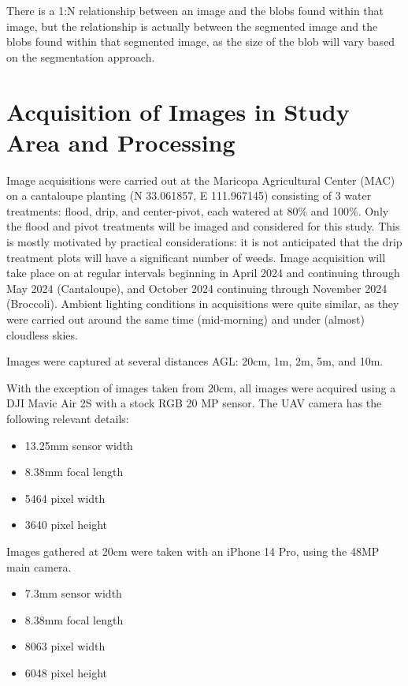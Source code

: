 \documentclass[letterpaper]{article}
\begin{document}
{There is a 1:N relationship between an image and the blobs found within that image, but the relationship is actually between the segmented image and the blobs found within that segmented image, as the size of the blob will vary based on the segmentation approach.

% 
%
\section{Acquisition of Images in Study Area and Processing}
Image acquisitions were carried out at the Maricopa Agricultural Center (MAC) on a cantaloupe planting (N 33.061857, E 111.967145) consisting of 3 water treatments: flood, drip, and center-pivot, each watered at 80\% and 100\%. Only the flood and pivot treatments will be imaged and considered for this study. This is mostly motivated by practical considerations: it is not anticipated that the drip treatment plots will have a significant number of weeds.  Image acquisition will take place on at regular intervals beginning in April 2024 and continuing through May 2024 (Cantaloupe), and October 2024 continuing through November 2024 (Broccoli).  Ambient lighting conditions in acquisitions were quite similar, as they were carried out around the same time (mid-morning) and under (almost) cloudless skies.

Images were captured at several distances AGL: 20cm, 1m, 2m, 5m, and 10m.

With the exception of images taken from 20cm, all images were acquired using a DJI Mavic Air 2S with a stock RGB 20 MP sensor. The UAV camera has the following relevant details:

\begin{itemize}
	\item{13.25mm sensor width}
	\item{8.38mm focal length}
	\item{5464 pixel width}
	\item{3640 pixel height}
\end{itemize}

Images gathered at 20cm were taken with an iPhone 14 Pro, using the 48MP main camera.

\begin{itemize}
	\item{7.3mm sensor width}
	\item{8.38mm focal length}
	\item{8063 pixel width}
	\item{6048 pixel height}
\end{itemize}

}
\end{document}
